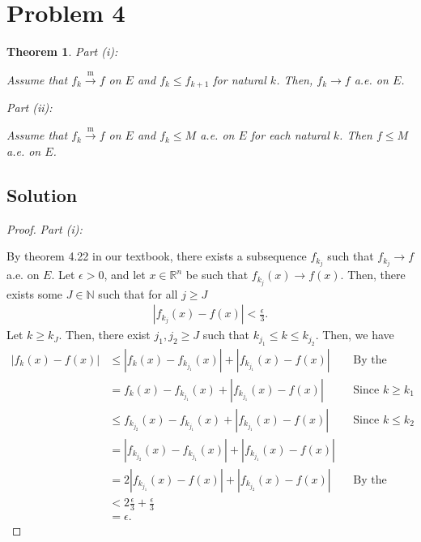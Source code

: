 \documentclass[10pt,a4paper]{article}
\makeatletter
\theoremstyle{theorem}
\newtheorem{theorem}{Theorem}
\newcommand{\proofpart}[2]{%
  \par
  \addvspace{\medskipamount}%
  \noindent\emph{Part #1: #2}\par\nobreak
  \addvspace{\smallskipamount}%
  \@afterheading
}
\theoremstyle{definition}
\makeatother
\begin{document}
\section*{Problem 4}
\begin{theorem}
\proofpart{(i)}{} Assume that $f_k \overset{\text{m}}{\to} f$ on $E$ and $f_k \leq f_{k + 1}$ for natural $k$.  Then, $f_k \to f$ a.e. on $E$.

\proofpart{(ii)}{} Assume that $f_k \overset{\text{m}}{\to} f$ on $E$ and $f_k \leq M$ a.e. on $E$ for each natural $k$. Then $f \leq M$ a.e. on $E$.
\end{theorem}

\subsection*{Solution}
\begin{proof}
\proofpart{(i)}{} 
By theorem 4.22 in our textbook, there exists a subsequence $f_{k_j}$ such that $f_{k_j} \to f$ a.e. on $E$.  Let $\epsilon > 0$, and let $x \in \mathbb{R}^n$ be such that $f_{k_j}(x) \to f(x)$. Then,  there exists some $J \in \mathbb{N}$ such that for all $j \geq J$
\begin{align*}
|f_{k_j}(x) - f(x)| < \frac{\epsilon}{3}.
\end{align*}
Let $k \geq k_J$. Then, there exist $j_1, j_2 \geq J$ such that $k_{j_1} \leq k \leq k_{j_2}$. Then, we have
\begin{align*}
|f_k(x) - f(x)| &\leq |f_k(x) - f_{k_{j_1}}(x)| + |f_{k_{j_1}}(x) - f(x)| &&\text{By the triangle inequality}\\
&= f_k(x) - f_{k_{j_1}}(x) + |f_{k_{j_1}}(x) - f(x)| &&\text{Since } k \geq k_1\\
&\leq f_{k_{j_2}}(x) - f_{k_{j_1}}(x) + |f_{k_{j_1}}(x) - f(x)| &&\text{Since } k \leq k_2\\
&= |f_{k_{j_2}}(x) - f_{k_{j_1}}(x)| + |f_{k_{j_1}}(x) - f(x)| \\
&= 2|f_{k_{j_1}}(x) - f(x)| + |f_{k_{j_2}}(x) - f(x)|&&\text{By the triangle inequality}\\
&< 2\frac{\epsilon}{3} + \frac{\epsilon}{3}\\
&= \epsilon.
\end{align*}


\end{proof}
\end{document}
